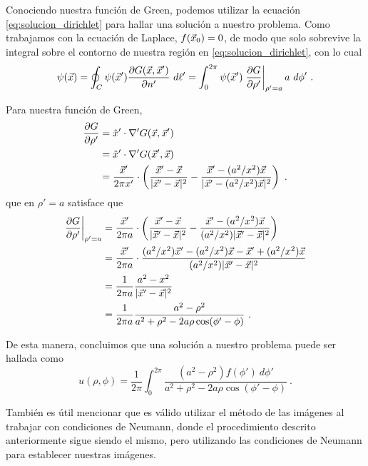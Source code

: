 \begin{ejemplo}
    Conociendo nuestra función de Green, podemos utilizar la ecuación \eqref{eq:solucion_dirichlet} para hallar una solución a nuestro problema. Como trabajamos con la ecuación de Laplace, $f(\vec{x}_0) = 0$, de modo que solo sobrevive la integral sobre el contorno de nuestra región en \eqref{eq:solucion_dirichlet}, con lo cual
    \begin{equation*}
        \psi(\vec{x}) = \oint_C \psi(\vec{x}') \frac{\partial G(\vec{x}, \vec{x}')}{\partial n'} \ d\ell' = \int_0^{2\pi} \psi(\vec{x}') \left. \frac{\partial G}{\partial \rho'}\right|_{\rho' = a} a \ d\phi' \ .
    \end{equation*}

    Para nuestra función de Green,
    \begin{align*}
        \frac{\partial G}{\partial \rho'} & = \hat{x}' \cdot \nabla' G(\vec{x},\vec{x}') \\
        & = \hat{x}' \cdot \nabla' G(\vec{x}',\vec{x}) \\
        & = \frac{\vec{x}'}{2\pi x'} \cdot \left( \frac{\vec{x}' - \vec{x}}{|\vec{x}' - \vec{x}|^2} - \frac{\vec{x}' - (a^2/x^2)\vec{x}}{|\vec{x}' - (a^2/x^2)\vec{x}|^2} \right) \ .
    \end{align*}
    que en $\rho' = a$ satisface que
    \begin{align*}
        \left. \frac{\partial G}{\partial \rho'} \right|_{\rho' = a} & = \frac{\vec{x}'}{2\pi a} \cdot \left( \frac{\vec{x}' - \vec{x}}{|\vec{x}' - \vec{x}|^2} - \frac{\vec{x}' - (a^2/x^2)\vec{x}}{(a^2/x^2)|\vec{x}' - \vec{x}|^2} \right) \\
        & = \frac{\vec{x}'}{2\pi a} \cdot \frac{(a^2/x^2)\vec{x}' - (a^2/x^2) \vec{x} - \vec{x}' + (a^2/x^2)\vec{x} }{(a^2/x^2)|\vec{x}' - \vec{x}|^2} \\
        & = \frac{1}{2\pi a} \frac{a^2 - x^2}{|\vec{x}' - \vec{x}|^2} \\
        & = \frac{1}{2\pi a} \frac{a^2 - \rho^2}{a^2 + \rho^2 - 2a\rho \cos(\phi' - \phi)} \ .
    \end{align*}
    
    De esta manera, concluimos que una solución a nuestro problema puede ser hallada como
    \begin{equation*}
        u(\rho, \phi) = \frac{1}{2\pi} \int_0^{2\pi}  \frac{(a^2 - \rho^2) f(\phi') \ d\phi'}{a^2 + \rho^2 - 2a\rho \cos(\phi' - \phi)} \ .
    \end{equation*}
\end{ejemplo}

También es útil mencionar que es válido utilizar el método de las imágenes al trabajar con condiciones de Neumann, donde el procedimiento descrito anteriormente sigue siendo el mismo, pero utilizando las condiciones de Neumann para establecer nuestras imágenes.

